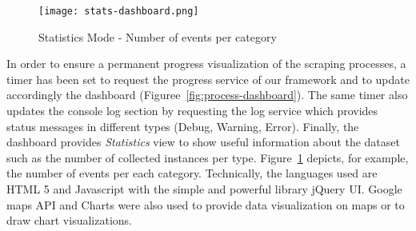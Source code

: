 \begin{figure}[htbp]
  \centering
  \texttt{[image: stats-dashboard.png]}
  \caption{Statistics Mode -  Number of events per category}
  \label{fig:stats-dashboard}
\end{figure}

In order to ensure a permanent progress visualization of the scraping processes, a timer has been set to request the progress service of our framework and to update accordingly the dashboard (Figuree~\ref{fig:process-dashboard}). The same timer also updates the console log section by requesting the log service which provides status messages in different types (Debug, Warning, Error). Finally, the dashboard provides \textit{Statistics} view to show useful information about the dataset such as the number of collected instances per type. Figure~\ref{fig:stats-dashboard} depicts, for example, the number of events per each category. Technically, the languages used are HTML 5 and Javascript with the simple and powerful library jQuery UI. Google maps API and Charts were also used to provide data visualization on maps or to draw chart visualizations.

